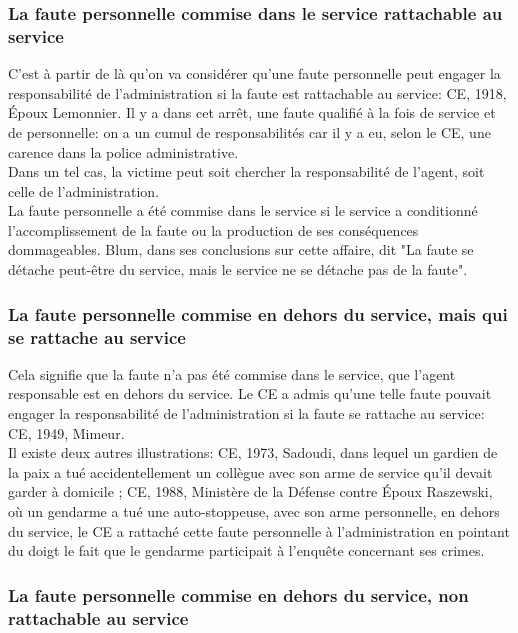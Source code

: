 \documentclass[10pt, a4paper, openany]{book}
\begin{document}
\subsubsection{La faute personnelle commise dans le service rattachable au service}

C'est à partir de là qu'on va considérer qu'une faute personnelle peut engager la responsabilité de l'administration si la faute est rattachable au service: CE, 1918, Époux Lemonnier. Il y a dans cet arrêt, une faute qualifié à la fois de service et de personnelle: on a un cumul de responsabilités car il y a eu, selon le CE, une carence dans la police administrative. \\
Dans un tel cas, la victime peut soit chercher la responsabilité de l'agent, soit celle de l'administration. \\
La faute personnelle a été commise dans le service si le service a conditionné l'accomplissement de la faute ou la production de ses conséquences dommageables. Blum, dans ses conclusions sur cette affaire, dit "La faute se détache peut-être du service, mais le service ne se détache pas de la faute". 

\subsubsection{La faute personnelle commise en dehors du service, mais qui se rattache au service}

Cela signifie que la faute n'a pas été commise dans le service, que l'agent responsable est en dehors du service. Le CE a admis qu'une telle faute pouvait engager la responsabilité de l'administration si la faute se rattache au service: CE, 1949, Mimeur. \\
Il existe deux autres illustrations: CE, 1973, Sadoudi, dans lequel un gardien de la paix a tué accidentellement un collègue avec son arme de service qu'il devait garder à domicile ; CE, 1988, Ministère de la Défense contre Époux Raszewski, où un gendarme a tué une auto-stoppeuse, avec son arme personnelle, en dehors du service, le CE a rattaché cette faute personnelle à l'administration en pointant du doigt le fait que le gendarme participait à l'enquête concernant ses crimes. 

\subsubsection{La faute personnelle commise en dehors du service, non rattachable au service}
\end{document}
